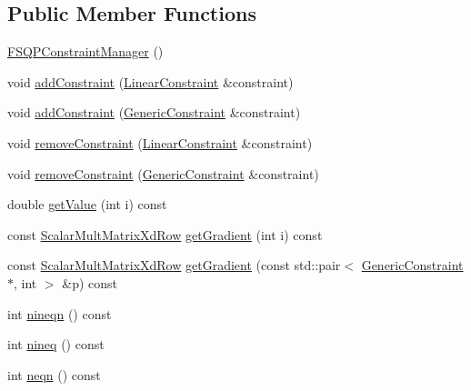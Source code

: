 \subsection*{Public Member Functions}
\begin{DoxyCompactItemize}
\item 
\hyperlink{classocra_1_1FSQPConstraintManager_adce56c9faf54d60f6a2a01db9db36310}{F\+S\+Q\+P\+Constraint\+Manager} ()
\item 
void \hyperlink{classocra_1_1FSQPConstraintManager_a17e4f4d67bd1cda3e88003e3409ea747}{add\+Constraint} (\hyperlink{namespaceocra_ae8b87cf4099be3efc3b410019ad2046e}{Linear\+Constraint} \&constraint)
\item 
void \hyperlink{classocra_1_1FSQPConstraintManager_ad85f524f15572eb08e324024c293d46c}{add\+Constraint} (\hyperlink{namespaceocra_af10341108ce661566aad00908668e2b1}{Generic\+Constraint} \&constraint)
\item 
void \hyperlink{classocra_1_1FSQPConstraintManager_ad32235da282d8a388d350410534877e0}{remove\+Constraint} (\hyperlink{namespaceocra_ae8b87cf4099be3efc3b410019ad2046e}{Linear\+Constraint} \&constraint)
\item 
void \hyperlink{classocra_1_1FSQPConstraintManager_a5632e44ca4824c5d07d40a942623397b}{remove\+Constraint} (\hyperlink{namespaceocra_af10341108ce661566aad00908668e2b1}{Generic\+Constraint} \&constraint)
\item 
double \hyperlink{classocra_1_1FSQPConstraintManager_a59c617c1b20d1130b2505a52a8b5491d}{get\+Value} (int i) const 
\item 
const \hyperlink{classocra_1_1FSQPConstraintManager_abe1cf7412d42b4a1b7158936a24ae6fb}{Scalar\+Mult\+Matrix\+Xd\+Row} \hyperlink{classocra_1_1FSQPConstraintManager_a0d9ac797b02390fed4d55515a75fd33d}{get\+Gradient} (int i) const 
\item 
const \hyperlink{classocra_1_1FSQPConstraintManager_abe1cf7412d42b4a1b7158936a24ae6fb}{Scalar\+Mult\+Matrix\+Xd\+Row} \hyperlink{classocra_1_1FSQPConstraintManager_a609fe4a3f10b5d633697a8c794af086b}{get\+Gradient} (const std\+::pair$<$ \hyperlink{namespaceocra_af10341108ce661566aad00908668e2b1}{Generic\+Constraint} $\ast$, int $>$ \&p) const 
\item 
int \hyperlink{classocra_1_1FSQPConstraintManager_aad869b28ff01695346c7635485e5779c}{nineqn} () const 
\item 
int \hyperlink{classocra_1_1FSQPConstraintManager_ad681a2c09cc9bcb7614e0c459457b585}{nineq} () const 
\item 
int \hyperlink{classocra_1_1FSQPConstraintManager_aaed104b5de70fe9bb8a0821816d3cd94}{neqn} () const 

\end{DoxyCompactItemize}
